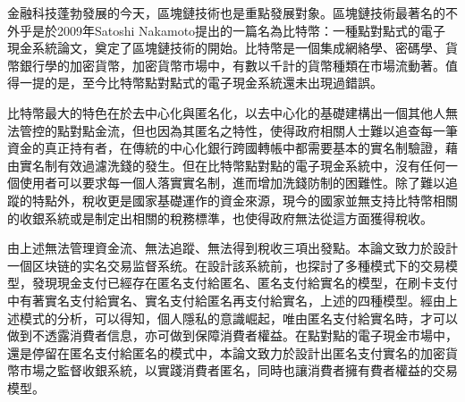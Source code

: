 \begin{cabstract}

	金融科技蓬勃發展的今天，區塊鏈技術也是重點發展對象。區塊鏈技術最著名的不外乎是於2009年Satoshi Nakamoto提出的一篇名為比特幣：一種點對點式的電子現金系統論文\supercite{bitcoinpaper}，奠定了區塊鏈技術的開始。比特幣是一個集成網絡學、密碼學、貨幣銀行學的加密貨幣，加密貨幣市場中，有數以千計的貨幣種類在市場流動著。值得一提的是，至今比特幣點對點式的電子現金系統還未出現過錯誤。

	比特幣最大的特色在於去中心化與匿名化，以去中⼼化的基礎建構出⼀個其他人無法管控的點對點⾦流，但也因為其匿名之特性，使得政府相關人⼠難以追查每⼀筆資⾦的真正持有者，在傳統的中心化銀行跨國轉帳中都需要基本的實名制驗證，藉由實名制有效過濾洗錢的發生。但在比特幣點對點的電子現金系統中，沒有任何一個使用者可以要求每一個人落實實名制，進而增加洗錢防制的困難性。除了難以追蹤的特點外，稅收更是國家基礎運作的資⾦來源，現今的國家並無支持比特幣相關的收銀系統或是制定出相關的稅務標準，也使得政府無法從這方面獲得稅收。

	由上述無法管理資金流、無法追蹤、無法得到稅收三項出發點。本論文致力於設計一個区块链的实名交易监督系统。在設計該系統前，也探討了多種模式下的交易模型，發現現金支付已經存在匿名支付給匿名、匿名支付給實名的模型，在刷卡支付中有著實名支付給實名、實名支付給匿名再支付給實名，上述的四種模型。經由上述模式的分析，可以得知，個人隱私的意識崛起，唯由匿名支付給實名時，才可以做到不透露消費者信息，亦可做到保障消費者權益。在點對點的電子現金市場中，還是停留在匿名支付給匿名的模式中，本論⽂致⼒於設計出匿名⽀付實名的加密貨幣市場之監督收銀系統，以實踐消費者匿名，同時也讓消費者擁有費者權益的交易模型。
\end{cabstract}

